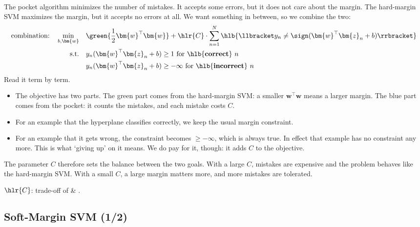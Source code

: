 The pocket algorithm minimizes the number of mistakes. It accepts some
errors, but it does not care about the margin. The hard-margin SVM maximizes
the margin, but it accepts no errors at all. We want something in between,
so we combine the two:
\[
    \begin{aligned}
        \text{combination:} \quad \min_{b, \bm{w}} \quad & \green{\frac{1}{2}
            \bm{w}^\top \bm{w}} + \hlr{C} \cdot \sum_{n=1}^N
            \hlb{\llbracket y_n \neq \sign(\bm{w}^\top \bm{z}_n + b)
            \rrbracket}\\
        \text{s.t.} \quad & y_n (\bm{w}^\top \bm{z}_n + b) \ge 1 \text{ for
            \hlb{\textbf{correct}} } n\\
        & y_n (\bm{w}^\top \bm{z}_n + b) \ge -\infty \text{ for
            \hlb{\textbf{incorrect}} } n
    \end{aligned}
\]
Read it term by term.
\begin{itemize}
    \item The objective has two parts. The green part comes from the
        hard-margin SVM: a smaller \(\bm{w}^\top \bm{w}\) means a larger
        margin. The blue part comes from the pocket: it counts the mistakes,
        and each mistake costs \(C\).
    \item For an example that the hyperplane classifies correctly, we keep
        the usual margin constraint.
    \item For an example that it gets wrong, the constraint becomes \(\ge
        -\infty\), which is always true. In effect that example has no
        constraint any more. This is what `giving up' on it means. We do pay
        for it, though: it adds \(C\) to the objective.
\end{itemize}
The parameter \(C\) therefore sets the balance between the two goals. With a
large \(C\), mistakes are expensive and the problem behaves like the
hard-margin SVM. With a small \(C\), a large margin matters more, and more
mistakes are tolerated.

\begin{moral}
    \(\hlr{C}\): trade-off of  \& .
\end{moral}

\subsection{Soft-Margin SVM (1/2)}

